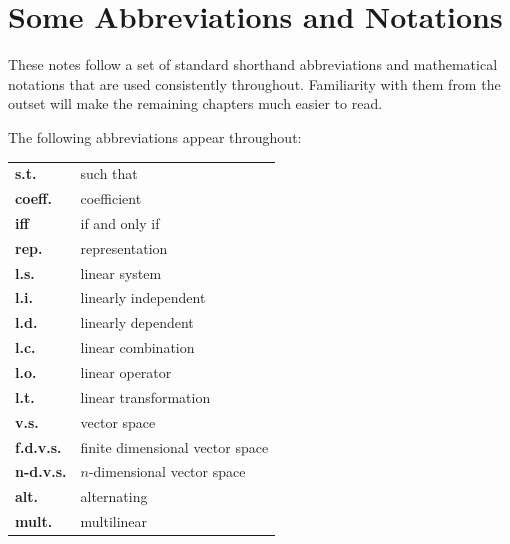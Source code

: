 \section{Some Abbreviations and Notations}

These notes follow a set of standard shorthand abbreviations and mathematical
notations that are used consistently throughout.  Familiarity with them from the
outset will make the remaining chapters much easier to read.

\begin{defbox}
The following abbreviations appear throughout:
\begin{center}
\renewcommand{\arraystretch}{1.25}
\begin{tabular}{ll}
    \textbf{s.t.}      & such that \\
    \textbf{coeff.}    & coefficient \\
    \textbf{iff}       & if and only if \\
    \textbf{rep.}      & representation \\
    \textbf{l.s.}      & linear system \\
    \textbf{l.i.}      & linearly independent \\
    \textbf{l.d.}      & linearly dependent \\
    \textbf{l.c.}      & linear combination \\
    \textbf{l.o.}      & linear operator \\
    \textbf{l.t.}      & linear transformation \\
    \textbf{v.s.}      & vector space \\
    \textbf{f.d.v.s.}  & finite dimensional vector space \\
    \textbf{n-d.v.s.}  & $n$-dimensional vector space \\
    \textbf{alt.}      & alternating \\
    \textbf{mult.}     & multilinear \\
\end{tabular}
\end{center}
\end{defbox}


